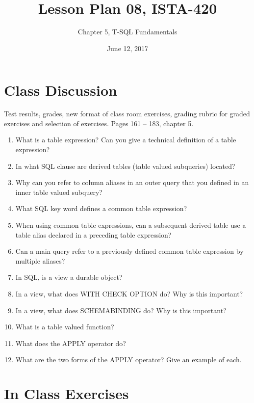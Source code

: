 \documentclass{article}
\title{Lesson Plan 08, ISTA-420}
\author{Chapter 5, T-SQL Fundamentals}
\date{June 12, 2017}
\begin{document}
    

    \maketitle{}

    \section{Class Discussion}

    Test results, grades, new format of class room exercises, grading rubric for graded exercises and selection of  exercises. 
    Pages 161 -- 183, chapter 5.

    \begin{enumerate}
        \item What is a table expression? Can you give a technical definition of a table expression?
        \item In what SQL clause are derived tables (table valued subqueries) located?
        \item Why can you refer to column aliases in an outer query that you defined in an inner table valued subquery?
        \item What SQL key word defines a common table expression?
        \item When using common table expressions, can a subsequent derived table use a table alias declared in a preceding table expression?
        \item Can a main query refer to a previously defined common table expression by multiple aliases?
        \item In SQL, is a view a durable object?
        \item In a view, what does WITH CHECK OPTION do? Why is this important?
        \item In a view, what does SCHEMABINDING do? Why is this important?
        \item What is a table valued function?
        \item What does the APPLY operator do?
        \item What are the two forms of the APPLY operator? Give an example of each.
    \end{enumerate}

    \section{In Class Exercises}
\end{document}

